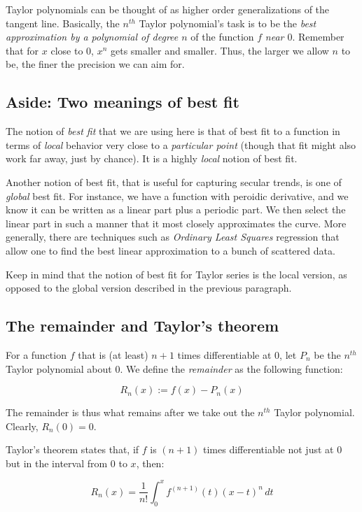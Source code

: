 \documentclass{amsart}
\begin{document}
Taylor polynomials can be thought of as higher order generalizations
of the tangent line. Basically, the $n^{th}$ Taylor polynomial's task
is to be the {\em best approximation by a polynomial of degree $n$} of
the function $f$ {\em near $0$}. Remember that for $x$ close to $0$,
$x^n$ gets smaller and smaller. Thus, the larger we allow $n$ to be,
the finer the precision we can aim for.

\subsection*{Aside: Two meanings of best fit}

The notion of {\em best fit} that we are using here is that of best
fit to a function in terms of {\em local} behavior very close to a
{\em particular point} (though that fit might also work far away, just
by chance). It is a highly {\em local} notion of best fit.

Another notion of best fit, that is useful for capturing secular
trends, is one of {\em global} best fit. For instance, we have a
function with peroidic derivative, and we know it can be written as a
linear part plus a periodic part. We then select the linear part in
such a manner that it most closely approximates the curve. More
generally, there are techniques such as {\em Ordinary Least Squares}
regression that allow one to find the best linear approximation to a
bunch of scattered data.

Keep in mind that the notion of best fit for Taylor series is the
local version, as opposed to the global version described in the
previous paragraph.

\subsection{The remainder and Taylor's theorem}

For a function $f$ that is (at least) $n + 1$ times differentiable at $0$,
let $P_n$ be the $n^{th}$ Taylor polynomial about $0$. We define the
{\em remainder} as the following function:

$$R_n(x) := f(x) - P_n(x)$$

The remainder is thus what remains after we take out the $n^{th}$
Taylor polynomial. Clearly, $R_n(0) = 0$. 

Taylor's theorem states that, if $f$ is $(n+1)$ times differentiable
not just at $0$ but in the interval from $0$ to $x$, then:

$$R_n(x) = \frac{1}{n!} \int_0^x f^{(n+1)}(t)(x - t)^n \, dt$$
\end{document}
